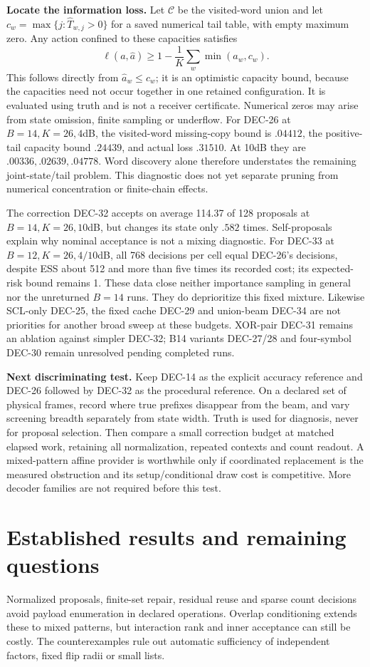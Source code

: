 \documentclass[10pt,a4paper]{article}
\begin{document}
\textbf{Locate the information loss.} Let $\mathcal C$ be the visited-word union and let
$c_w=\max\{j:\widehat T_{w,j}>0\}$ for a saved numerical tail table, with empty maximum zero.
Any action confined to these capacities satisfies
\[
 \ell(a,\widehat a)\geq 1-\frac1K\sum_w\min(a_w,c_w).
\]
This follows directly from $\widehat a_w\leq c_w$; it is an optimistic capacity bound, because the
capacities need not occur together in one retained configuration. It is evaluated using truth and
is not a receiver certificate. Numerical zeros may arise from state omission, finite sampling or underflow.
For DEC-26 at $B=14,K=26,4$dB, the visited-word missing-copy bound is $.04412$, the positive-tail capacity
bound $.24439$, and actual loss $.31510$. At 10dB they are $.00336,.02639,.04778$.
Word discovery alone therefore understates the remaining joint-state/tail problem. This diagnostic
does not yet separate pruning from numerical concentration or finite-chain effects.

The correction DEC-32 accepts on average 114.37 of 128 proposals at $B=14,K=26,10$dB, but changes its state
only $.582$ times. Self-proposals explain why nominal acceptance is not a mixing diagnostic.
For DEC-33 at $B=12,K=26,4/10$dB, all 768 decisions per cell equal DEC-26's decisions, despite ESS about 512
and more than five times its recorded cost; its expected-risk bound remains 1. These data close neither
importance sampling in general nor the unreturned $B=14$ runs. They do deprioritize this fixed mixture.
Likewise SCL-only DEC-25, the fixed cache DEC-29 and union-beam DEC-34 are not priorities for another broad sweep at
these budgets. XOR-pair DEC-31 remains an ablation against simpler DEC-32; B14 variants DEC-27/28 and four-symbol DEC-30
remain unresolved pending completed runs.

\textbf{Next discriminating test.} Keep DEC-14 as the explicit accuracy reference and DEC-26 followed by DEC-32 as
the procedural reference. On a declared set of physical frames, record where true prefixes disappear
from the beam, and vary screening breadth separately from state width. Truth is used for diagnosis,
never for proposal selection. Then compare a small correction budget at matched elapsed work, retaining
all normalization, repeated contexts and count readout. A mixed-pattern affine provider is worthwhile
only if coordinated replacement is the measured obstruction and its setup/conditional draw cost is
competitive. More decoder families are not required before this test.

\section{Established results and remaining questions}
Normalized proposals, finite-set repair, residual reuse and sparse count decisions avoid payload
enumeration in declared operations. Overlap conditioning extends these to mixed patterns, but interaction
rank and inner acceptance can still be costly. The counterexamples rule out automatic sufficiency of
independent factors, fixed flip radii or small lists.
\end{document}
